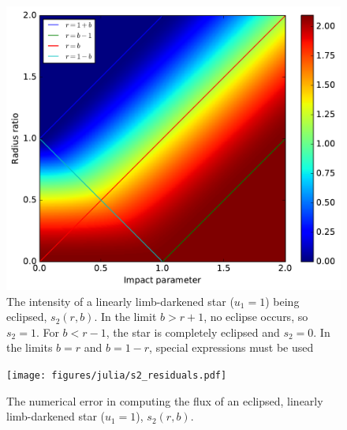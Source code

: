 \documentclass[modern]{aastex61}
\begin{document}
\begin{figure}\label{transit_linear}
    \begin{centering}
    \includegraphics[width=0.85\linewidth]{figures/julia/transit_linear.pdf}
    \caption{The intensity of a linearly limb-darkened star ($u_1=1$) being
    eclipsed, $s_2(r,b)$.
    In the limit $b > r+1$, no eclipse occurs, so $s_2=1$.  For $b < r-1$, the star
    is completely eclipsed and $s_2=0$.  In the limits $b=r$ and $b=1-r$, special
    expressions must be used}
    \end{centering}
\end{figure}

\begin{figure}\label{s2_plot}
    \begin{centering}
    \texttt{[image: figures/julia/s2\_residuals.pdf]}
    \caption{The numerical error in computing the flux of an eclipsed,  linearly
    limb-darkened star ($u_1=1$), $s_2(r,b)$.}
    \end{centering}
\end{figure}
\end{document}
